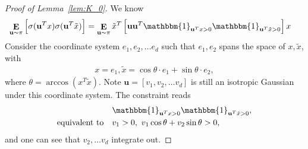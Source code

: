 \documentclass[11pt]{article}
\numberwithin{equation}{section}
\def\E{\mathop{\mathbf{E}}}
\def\bd#1{\mathbf{#1}}
\begin{document}
\begin{proof}[Proof of Lemma~\ref{lem:K_0}]
	We know
	\begin{align}
		\E_{\bd{u} \sim \pi} \left[ \sigma(\bd{u}^T x)  \sigma(\bd{u}^T \tilde x ) \right] &= 
		\E_{\bd{u} \sim \pi} \tilde x^T \left[ \bd{u} \bd{u}^T \mathbbm{1}_{\bd{u}^T x >0} \mathbbm{1}_{\bd{u}^T \tilde x >0} \right]   x
	\end{align}
	Consider the coordinate system $e_1, e_2, \ldots e_d$ such that $e_1, e_2$ spans the space of $x, \tilde x$, with 	\begin{align}
		x = e_1, \tilde x = \cos\theta \cdot e_1 + \sin\theta \cdot e_2,
	\end{align}
	where $\theta = \arccos(x^T\tilde x)$. Note $\bd{u} = [v_1, v_2, \ldots v_d]$ is still an isotropic Gaussian under this coordinate system.
	The constraint reads
	\begin{align}
		&\mathbbm{1}_{\bd{u}^T x >0} \mathbbm{1}_{\bd{u}^T \tilde x >0}, \\
		\text{equivalent to} \quad & v_1 >0 , ~v_1 \cos\theta + v_2 \sin\theta >0,
	\end{align}
	and one can see that $v_2, \ldots v_d$ integrate out.
	

\end{proof}
\end{document}
